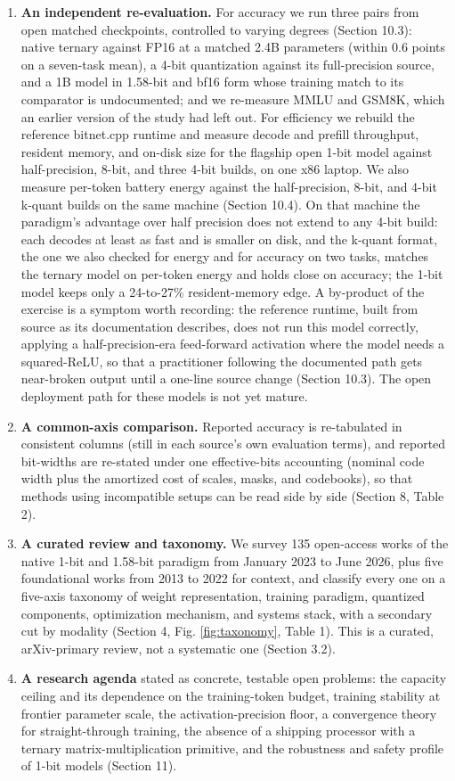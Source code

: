 \documentclass[11pt]{article}
\begin{document}
\begin{enumerate}
  \item \textbf{An independent re-evaluation.} For accuracy we run three pairs from open matched checkpoints, controlled to varying degrees (Section 10.3): native ternary against FP16 at a matched 2.4B parameters (within 0.6 points on a seven-task mean), a 4-bit quantization against its full-precision source, and a 1B model in 1.58-bit and bf16 form whose training match to its comparator is undocumented; and we re-measure MMLU and GSM8K, which an earlier version of the study had left out. For efficiency we rebuild the reference bitnet.cpp runtime and measure decode and prefill throughput, resident memory, and on-disk size for the flagship open 1-bit model against half-precision, 8-bit, and three 4-bit builds, on one x86 laptop. We also measure per-token battery energy against the half-precision, 8-bit, and 4-bit k-quant builds on the same machine (Section 10.4). On that machine the paradigm's advantage over half precision does not extend to any 4-bit build: each decodes at least as fast and is smaller on disk, and the k-quant format, the one we also checked for energy and for accuracy on two tasks, matches the ternary model on per-token energy and holds close on accuracy; the 1-bit model keeps only a 24-to-27\% resident-memory edge. A by-product of the exercise is a symptom worth recording: the reference runtime, built from source as its documentation describes, does not run this model correctly, applying a half-precision-era feed-forward activation where the model needs a squared-ReLU, so that a practitioner following the documented path gets near-broken output until a one-line source change (Section 10.3). The open deployment path for these models is not yet mature.
  \item \textbf{A common-axis comparison.} Reported accuracy is re-tabulated in consistent columns (still in each source's own evaluation terms), and reported bit-widths are re-stated under one effective-bits accounting (nominal code width plus the amortized cost of scales, masks, and codebooks), so that methods using incompatible setups can be read side by side (Section 8, Table 2).
  \item \textbf{A curated review and taxonomy.} We survey 135 open-access works of the native 1-bit and 1.58-bit paradigm from January 2023 to June 2026, plus five foundational works from 2013 to 2022 for context, and classify every one on a five-axis taxonomy of weight representation, training paradigm, quantized components, optimization mechanism, and systems stack, with a secondary cut by modality (Section 4, Fig. \ref{fig:taxonomy}, Table 1). This is a curated, arXiv-primary review, not a systematic one (Section 3.2).
  \item \textbf{A research agenda} stated as concrete, testable open problems: the capacity ceiling and its dependence on the training-token budget, training stability at frontier parameter scale, the activation-precision floor, a convergence theory for straight-through training, the absence of a shipping processor with a ternary matrix-multiplication primitive, and the robustness and safety profile of 1-bit models (Section 11).
\end{enumerate}
\end{document}
